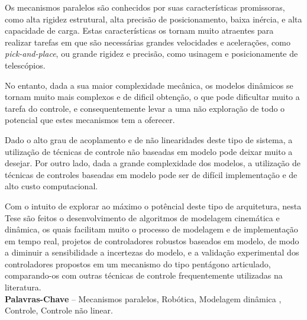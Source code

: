\documentclass[]{politex}
\begin{document}


\begin{resumo}
Os mecanismos paralelos são conhecidos por suas características promissoras, como alta rigidez estrutural,  alta precisão de posicionamento, baixa inércia, e alta capacidade de carga. Estas características os tornam muito atraentes para realizar tarefas em que são necessárias grandes velocidades e acelerações, como {\em pick-and-place}, ou grande rigidez e precisão, como usinagem e posicionamente de telescópios.

No entanto, dada a sua maior complexidade mecânica, os modelos dinâmicos se tornam muito mais complexos e de dificil obtenção, o que pode dificultar muito a tarefa do controle, e consequentemente levar a uma não exploração de todo o potencial que estes mecanismos tem a oferecer.

Dado o alto grau de acoplamento e de não linearidades deste tipo de sistema, a utilização de técnicas de controle não baseadas em modelo pode deixar muito a desejar. Por outro lado, dada a grande complexidade dos modelos, a utilização de técnicas de controles baseadas em modelo pode ser de difícil implementação e de alto custo computacional.

Com o intuito de explorar ao máximo o potêncial deste tipo de arquitetura, nesta Tese são feitos o desenvolvimento de algoritmos de modelagem cinemática e dinâmica, os quais facilitam muito o processo de modelagem e de implementação em tempo real, projetos de controladores robustos baseados em modelo, de modo a diminuir a sensibilidade a incertezas do modelo, e a validação experimental dos controladores propostos em um mecanismo do tipo pentágono articulado, comparando-os com outras técnicas de controle frequentemente utilizadas na literatura.
%
\\[3\baselineskip]
%
\textbf{Palavras-Chave} -- Mecanismos paralelos, Robótica, Modelagem dinâmica , Controle, Controle não linear.
\end{resumo}
\end{document}
